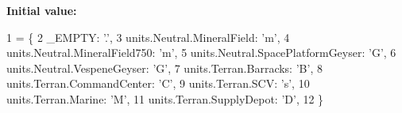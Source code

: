 {\bfseries Initial value\+:}
\begin{DoxyCode}
1 =  \{
2     \_EMPTY: \textcolor{stringliteral}{'.'},
3     units.Neutral.MineralField: \textcolor{stringliteral}{'m'},
4     units.Neutral.MineralField750: \textcolor{stringliteral}{'m'},
5     units.Neutral.SpacePlatformGeyser: \textcolor{stringliteral}{'G'},
6     units.Neutral.VespeneGeyser: \textcolor{stringliteral}{'G'},
7     units.Terran.Barracks: \textcolor{stringliteral}{'B'},
8     units.Terran.CommandCenter: \textcolor{stringliteral}{'C'},
9     units.Terran.SCV: \textcolor{stringliteral}{'s'},
10     units.Terran.Marine: \textcolor{stringliteral}{'M'},
11     units.Terran.SupplyDepot: \textcolor{stringliteral}{'D'},
12 \}
\end{DoxyCode}
